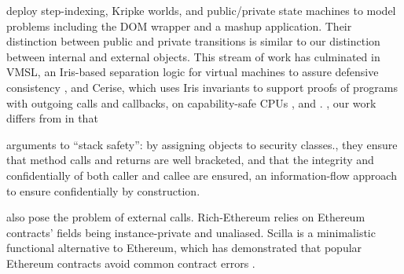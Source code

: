 \citet{dd} deploy step-indexing, Kripke worlds, and %
  public/private state machines to model problems including the 
DOM wrapper and a mashup application.
Their distinction between public and private transitions %
is similar  to our
distinction between internal and external objects.
This stream of work has culminated in VMSL, an Iris-based separation logic for
virtual machines to assure defensive consistency
\cite{vmsl-pldi2023},
%
%
and Cerise, which uses Iris invariants to support proofs of programs with outgoing calls and callbacks,
on capability-safe CPUs \cite{cerise-jacm2024},
and .
, our work differs from
in that 
%

 arguments to ``stack
safety'': by assigning objects to security
classes., they ensure that method calls and returns are well bracketed,
and that the integrity and confidentially of both
caller and callee are ensured, 
an information-flow approach to ensure confidentially by construction.
 

 also pose the problem of external calls.
Rich-Ethereum \cite{rich-specs-smart-contracts-oopsla2021}
relies on Ethereum contracts' fields being instance-private
and unaliased. %
Scilla \cite{sergey-scilla-oopsla2019}
is a minimalistic functional alternative to Ethereum,
which has demonstrated that popular Ethereum
contracts avoid common contract errors .
%


